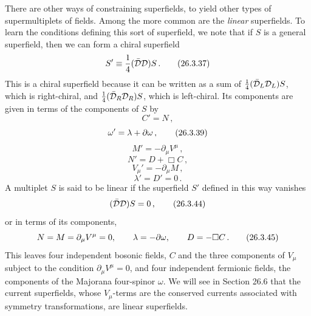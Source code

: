 There are other ways of constraining superfields, to yield other types of
supermultiplets of fields. Among the more common are the \emph{linear}
superfields. To learn the conditions defining this sort of superfield, we note
that if $S$ is a general superfield, then we can form a chiral superfield
\begin{equation}
  S'\equiv\frac14(\bar{\mathcal{D}}\mathcal{D})S\,.
  \tag{26.3.37}\label{eq:26.3.37}
\end{equation}
This is a chiral superfield because it can be written as a sum of
$\frac14(\bar{\mathcal{D}}_L\mathcal{D}_L)S$, which is right-chiral, and
$\frac14(\bar{\mathcal{D}}_R\mathcal{D}_R)S$, which is left-chiral. Its components are
given in terms of the components of $S$ by
\begin{equation}
  C'=N\,,
  \tag{26.3.38}\label{eq:26.3.38}
\end{equation}
\begin{equation}
  \omega'=\lambda+\sl{\partial}\omega\,,
  \tag{26.3.39}\label{eq:26.3.39}
\end{equation}
\begin{equation}
  M'=-\partial_\mu V^\mu\,,
  \tag{26.3.40}\label{eq:26.3.40}
\end{equation}
\begin{equation}
  N'=D+\Box C\,,
  \tag{26.3.41}\label{eq:26.3.41}
\end{equation}
\begin{equation}
  V_\mu'=-\partial_\mu M\,,
  \tag{26.3.42}\label{eq:26.3.42}
\end{equation}
\begin{equation}
  \lambda'=D'=0\,.
  \tag{26.3.43}\label{eq:26.3.43}
\end{equation}
A multiplet $S$ is said to be linear if the superfield $S'$ defined in this
way vanishes
\begin{equation}
  (\bar{\mathcal{D}}\mathcal{D})S=0\,,
  \tag{26.3.44}\label{eq:26.3.44}
\end{equation}
or in terms of its components,
\begin{equation}
  N=M=\partial_\mu V^\mu=0,\qquad
  \lambda=-\sl{\partial}\omega,\qquad
  D=-\Box C\,.
  \tag{26.3.45}\label{eq:26.3.45}
\end{equation}
This leaves four independent bosonic fields, $C$ and the three components of
$V_\mu$ subject to the condition $\partial_\mu V^\mu=0$, and four independent
fermionic fields, the components of the Majorana four-spinor $\omega$. We
will see in Section 26.6 that the current superfields, whose $V_\mu$-terms are
the conserved currents associated with symmetry transformations, are linear
superfields.
